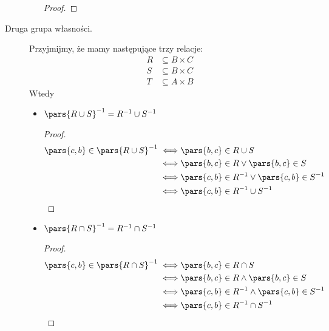 \begin{description}
\begin{itemize}
\begin{proof}
                \end{proof}
        \end{itemize}
    \item[Druga grupa własności.] Przyjmijmy, że mamy następujące trzy relacje:
        \begin{align*}
            R &\subseteq B \times C\\
            S &\subseteq B \times C\\
            T &\subseteq A \times B
        \end{align*}
        Wtedy
        \begin{itemize}
            \item \(\pars{R \cup S}^{-1} = R^{-1} \cup S^{-1}\)
                \begin{proof}
                    \begin{equation*}
                        \begin{split}
                            \pars{c, b} \in \pars{R \cup S}^{-1}
                                \iff& \pars{b, c} \in R \cup S\\
                                \iff& \pars{b, c} \in R \lor \pars{b, c} \in S\\
                                \iff& \pars{c, b} \in R^{-1} \lor \pars{c, b} \in S^{-1}\\
                                \iff& \pars{c, b} \in R^{-1} \cup S^{-1}
                        \end{split}
                    \end{equation*}
                \end{proof}
            \item \(\pars{R \cap S}^{-1} = R^{-1} \cap S^{-1}\)
                \begin{proof}
                    \begin{equation*}
                        \begin{split}
                            \pars{c, b} \in \pars{R \cap S}^{-1}
                                \iff& \pars{b, c} \in R \cap S\\
                                \iff& \pars{b, c} \in R \land \pars{b, c} \in S\\
                                \iff& \pars{c, b} \in R^{-1} \land \pars{c, b} \in S^{-1}\\
                                \iff& \pars{c, b} \in R^{-1} \cap S^{-1}
                        \end{split}
                    \end{equation*}

\end{proof}
\end{itemize}
\end{description}
